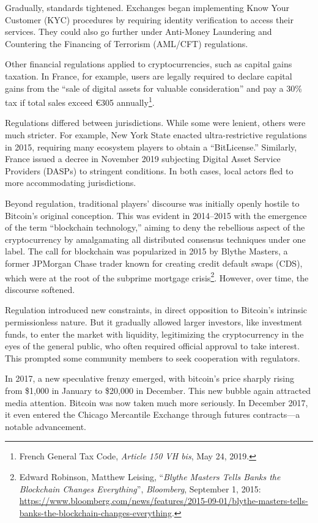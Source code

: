 \documentclass[
  a5paper,
  smalldemyvopaper,10pt,twoside,onecolumn,openright,extrafontsizes,hidelinks]{memoir}
\begin{document}
Gradually, standards tightened. Exchanges began implementing Know Your
Customer (KYC) procedures by requiring identity verification to access
their services. They could also go further under Anti-Money Laundering
and Countering the Financing of Terrorism (AML/CFT) regulations.

Other financial regulations applied to cryptocurrencies, such as capital
gains taxation. In France, for example, users are legally required to
declare capital gains from the ``sale of digital assets for valuable
consideration'' and pay a 30\% tax if total sales exceed €305
annually\footnote{French General Tax Code, \emph{Article 150 VH bis},
  May 24, 2019.}.

Regulations differed between jurisdictions. While some were lenient,
others were much stricter. For example, New York State enacted
ultra-restrictive regulations in 2015, requiring many ecosystem players
to obtain a ``BitLicense.'' Similarly, France issued a decree in
November 2019 subjecting Digital Asset Service Providers (DASPs) to
stringent conditions. In both cases, local actors fled to more
accommodating jurisdictions.

Beyond regulation, traditional players' discourse was initially openly
hostile to Bitcoin's original conception. This was evident in 2014--2015
with the emergence of the term ``blockchain technology,'' aiming to deny
the rebellious aspect of the cryptocurrency by amalgamating all
distributed consensus techniques under one label. The call for
blockchain was popularized in 2015 by Blythe Masters, a former JPMorgan
Chase trader known for creating credit default swaps (CDS), which were
at the root of the subprime mortgage crisis\footnote{Edward Robinson,
  Matthew Leising, ``\emph{Blythe Masters Tells Banks the Blockchain
  Changes Everything}'', \emph{Bloomberg}, September 1, 2015:
  \url{https://www.bloomberg.com/news/features/2015-09-01/blythe-masters-tells-banks-the-blockchain-changes-everything}.}.
However, over time, the discourse softened.

Regulation introduced new constraints, in direct opposition to Bitcoin's
intrinsic permissionless nature. But it gradually allowed larger
investors, like investment funds, to enter the market with liquidity,
legitimizing the cryptocurrency in the eyes of the general public, who
often required official approval to take interest. This prompted some
community members to seek cooperation with regulators.

In 2017, a new speculative frenzy emerged, with bitcoin's price sharply
rising from \$1,000 in January to \$20,000 in December. This new bubble
again attracted media attention. Bitcoin was now taken much more
seriously. In December 2017, it even entered the Chicago Mercantile
Exchange through futures contracts---a notable advancement.
\end{document}
